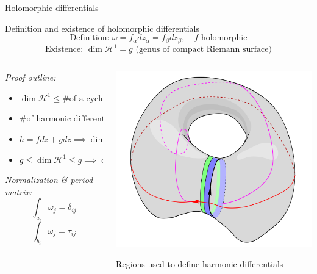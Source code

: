 \documentclass[11pt,aspectratio=169]{beamer}
\begin{document}
\begin{frame}{Holomorphic differentials}
    \begin{block}{Definition and existence of holomorphic differentials}
        \vspace{-1em}
        \[\text{Definition: } \omega = f_\alpha dz_\alpha = f_\beta dz_\beta , \quad f \text{ holomorphic}\]
        \[\text{Existence: } \dim \mathcal H^1 = g \text{ (genus of compact Riemann surface)}\]
    \end{block}

    \pause{}

    \begin{columns}[onlytextwidth]
        \begin{column}{0.55\textwidth}
            \emph{Proof outline:}
            \begin{itemize}
                \item $\dim \mathcal H^1 \leq \text{\# of a-cycles} = g$
                \item $\text{\# of harmonic differentials} = \dim H \geq 2g$
                \item $h = f dz + g d \bar z \implies \dim H = 2 \dim \mathcal H^1$
                \item $g \leq \dim \mathcal H^1 \leq g \implies \dim \mathcal H^1 = g$
            \end{itemize}

            \emph{Normalization \& period matrix:}
            \[ \int_{a_i} \omega_j = \delta_{ij} \]
            \[ \int_{b_i} \omega_j = \tau_{ij} \]
        \end{column}
        \begin{column}{0.45\textwidth}
            \center{}
            \includegraphics[width=0.8\columnwidth]{assets/HarmonicDifferential.png}
            
            \tiny Regions used to define harmonic differentials

            \cite{Ber06}
        \end{column}
    \end{columns}
\end{frame}
\end{document}
